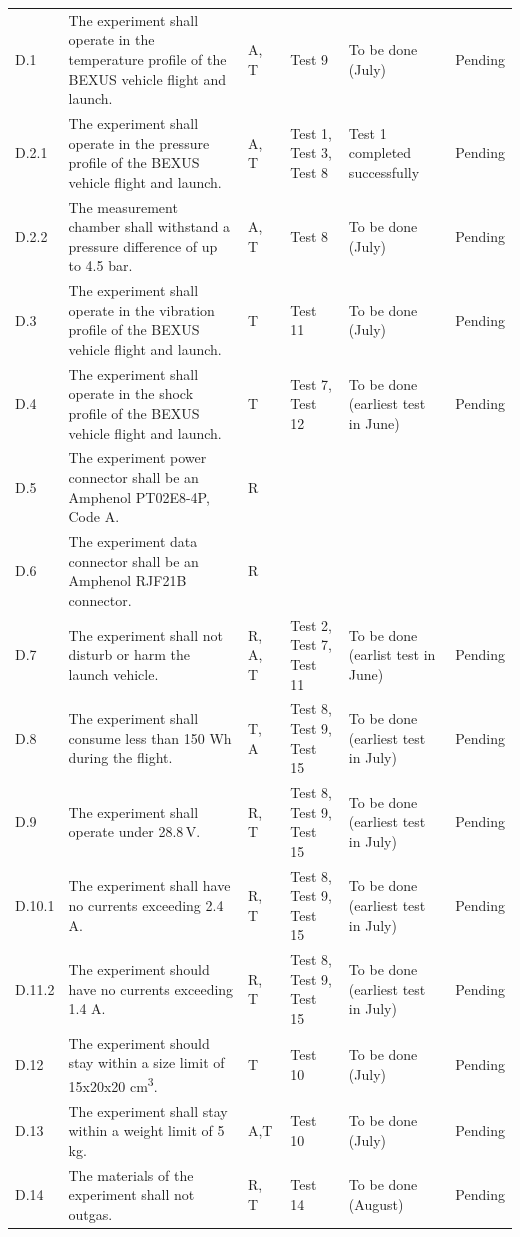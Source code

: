 \begin{longtable}{L{0.7cm}L{5cm}L{1.5cm}L{2cm}L{2.5cm}L{2cm}}
D.1 & The experiment shall operate in the temperature profile of the BEXUS vehicle flight and launch. & A, T & Test 9 & To be done (July) & Pending \\
D.2.1 & The experiment shall operate in the pressure profile of the BEXUS vehicle flight and launch. & A, T & Test 1, Test 3, Test 8 & Test 1 completed successfully  & Pending \\
D.2.2 & The measurement chamber shall withstand a pressure difference of up to 4.5 bar.  & A, T & Test 8 & To be done (July) & Pending \\
D.3 & The experiment shall operate in the vibration profile of the BEXUS vehicle flight and launch. & T & Test 11 & To be done (July) & Pending \\
D.4 & The experiment shall operate in the shock profile of the BEXUS vehicle flight and launch.& T & Test 7, Test 12 & To be done (earliest test in June) & Pending  \\
D.5 & The experiment power connector shall be an Amphenol PT02E8-4P, Code A. & R & & & \\
D.6 & The experiment data connector shall be an Amphenol RJF21B connector.  & R & & & \\
D.7 & The experiment shall not disturb or harm the launch vehicle.  & R, A, T & Test 2, Test 7, Test 11 & To be done (earlist test in June) & Pending \\
D.8 & The experiment shall consume less than 150 Wh during the flight. & T, A & Test 8, Test 9, Test 15 & To be done (earliest test in July) & Pending \\
D.9 & The experiment shall operate under 28.8\,V.  & R, T & Test 8, Test 9, Test 15 & To be done (earliest test in July) & Pending \\
D.10.1 & The experiment shall have no currents exceeding 2.4 A. & R, T & Test 8, Test 9, Test 15 & To be done (earliest test in July) & Pending \\
D.11.2 & The experiment should have no currents exceeding 1.4 A.  & R, T & Test 8, Test 9, Test 15 & To be done (earliest test in July) & Pending \\
D.12 & The experiment should stay within a size limit of 15x20x20 cm\textsuperscript{3}. & T & Test 10 & To be done (July) & Pending  \\
D.13 & The experiment shall stay within a weight limit of 5 kg. & A,T & Test 10 & To be done (July) & Pending \\
D.14 & The materials of the experiment shall not outgas. & R, T & Test 14 & To be done (August) & Pending \\


\end{longtable}
